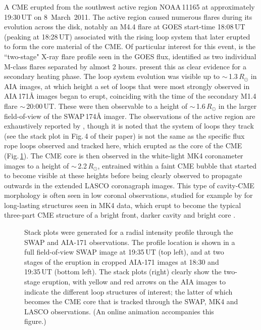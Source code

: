 \documentclass[namedreferences]{solarphysics}
\begin{document}
\begin{article}
A CME erupted from the southwest active region NOAA\,11165 at approximately 19:30\,UT on 8~March~2011. The active region caused numerous flares during its evolution across the disk, notably an M4.4 flare at GOES start-time 18:08\,UT (peaking at 18:28\,UT) associated with the rising loop system that later erupted to form the core material of the CME. Of particular interest for this event, is the ``two-stage" X-ray flare profile seen in the GOES flux, identified as two individual M-class flares separated by almost 2 hours.  present this as clear evidence for a secondary heating phase. The loop system evolution was visible up to $\sim$\,1.3\,$R_{\odot}$ in AIA images, at which height a set of loops that were most strongly observed in AIA\,171{\AA} images began to erupt, coinciding with the time of the secondary M1.4 flare $\sim$\,20:00\,UT. These were then observable to a height of $\sim$\,1.6\,$R_{\odot}$ in the larger field-of-view of the SWAP\,174{\AA} imager. The observations of the active region are exhaustively reported by , though it is noted that the system of loops they track (see the stack plot in Fig.\,4 of their paper) is not the same as the specific flux rope loops observed and tracked here, which erupted as the core of the CME (Fig.\,\ref{stackplots}). The CME core is then observed in the white-light MK4 coronameter images to a height of $\sim$\,2.2\,$R_{\odot}$, entrained within a faint CME bubble that started to become visible at these heights before being clearly observed to propagate outwards in the extended LASCO coronagraph images. This type of cavity-CME morphology is often seen in low coronal observations, studied for example by  for long-lasting structures seen in MK4 data, which erupt to become the typical three-part CME structure of a bright front, darker cavity and bright core .  %

\begin{figure}[t]
\caption{Stack plots were generated for a radial intensity profile through the SWAP and AIA-171 observations. The profile location is shown in a full field-of-view SWAP image at 19:35\,UT (top left), and at two stages of the eruption in cropped AIA-171 images at 18:30 and 19:35\,UT (bottom left). The stack plots (right) clearly show the two-stage eruption, with yellow and red arrows on the AIA images to indicate the different loop structures of interest; the latter of which becomes the CME core that is tracked through the SWAP, MK4 and LASCO observations. (An online animation accompanies this figure.)}
\label{stackplots}
\end{figure}


\end{article}
\end{document}
